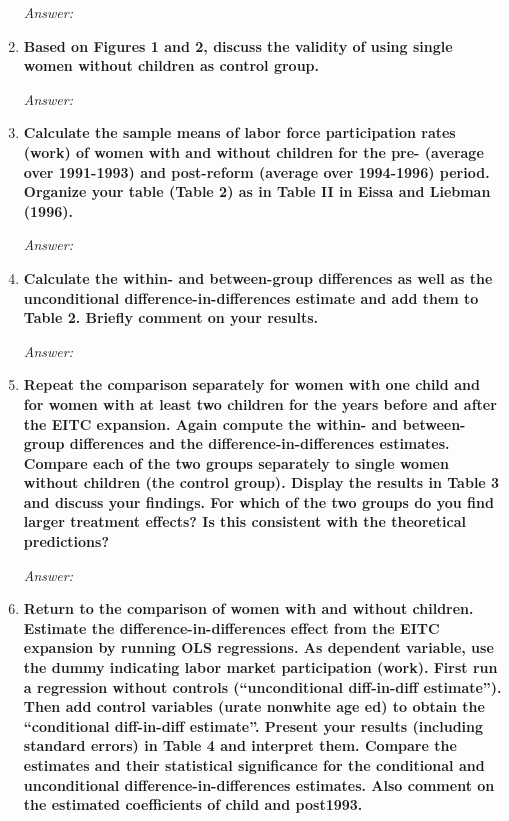 \documentclass{article}
\begin{document}
\begin{enumerate}
\textit{Answer: }

\item \textbf{Based on Figures 1 and 2, discuss the validity of using single women without children as control group.   }


\textit{Answer: }



\item \textbf{ Calculate the sample means of labor force participation rates (work) of women with and without children for the pre- (average over 1991-1993) and post-reform (average over 1994-1996) period. Organize your table (Table 2) as in Table II in Eissa and Liebman (1996).  }


\textit{Answer: }

\item \textbf{  Calculate the within- and between-group differences as well as the unconditional difference-in-differences estimate and add them to Table 2. Briefly comment on your results. }


\textit{Answer: }

\item \textbf{ Repeat the comparison separately for women with one child and for women with at least two children for the years before and after the EITC expansion. Again compute the within- and between-group differences and the difference-in-differences estimates. Compare each of the two groups separately to single women without children (the control group). Display the results in Table 3 and discuss your findings. For which of the two groups do you find larger treatment effects? Is this consistent with the theoretical predictions?  }


\textit{Answer: }

\item \textbf{ Return to the comparison of women with and without children. Estimate the difference-in-differences effect from the EITC expansion by running OLS regressions. As dependent variable, use the dummy indicating labor market participation (work). First run a regression without controls (“unconditional diff-in-diff estimate”). Then add control variables (urate nonwhite age ed) to obtain the “conditional diff-in-diff estimate”. Present your results (including standard errors) in Table 4 and interpret them. Compare the estimates and their statistical significance for the conditional and unconditional difference-in-differences estimates. Also comment on the estimated coefficients of child and post1993.  }



\end{enumerate}
\end{document}
